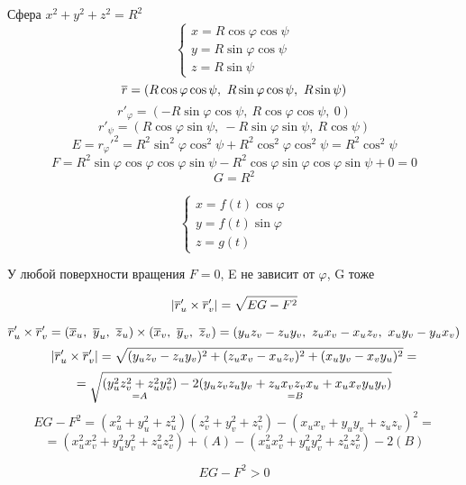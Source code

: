 \documentclass[main]{subfiles}
\begin{document}

	\begin{example}
		Сфера $x^2 + y^2 + z^2 = R^2$
		\[\begin{cases}
		  x = R \cos\varphi \cos\psi\\
		  y = R \sin\varphi \cos\psi\\
		  z = R \sin\psi
		\end{cases}\]
		\[\overline{r} = (R \cos\varphi \cos\psi,\ R\sin\varphi \cos\psi,\ R \sin\psi)\]
		\[r'_{\varphi} = (-R \sin\varphi \cos\psi,\ R\cos\varphi \cos\psi,\ 0)\]
		\[r'_{\psi} = (R \cos\varphi \sin\psi,\ -R\sin\varphi \sin\psi,\ R \cos\psi)\]
		\[E = r_{\varphi}'^2 = R^2 \sin^2 \varphi \cos^2 \psi + R^2 \cos^2 \varphi \cos^2 \psi = R^2 \cos^2 \psi\]
		\[F = R^2 \sin\varphi \cos\varphi\cos\varphi\sin\psi - R^2 \cos\varphi \sin\varphi \cos\varphi \sin\psi + 0 = 0\]
		\[G = R^2\]
	\end{example}

	\begin{Example} 
		\[\begin{cases}
		  x = f(t) \cos\varphi\\
		  y = f(t) \sin\varphi\\
		  z = g(t)
		\end{cases}\]
	\end{Example}

	\begin{upr}
		У любой поверхности вращения $F=0$, E не зависит от $\varphi$, G тоже
	\end{upr}

	\begin{Theorem}
		\[|\overline{r}'_u \times \overline{r}'_v| = \sqrt{EG-F^2}\]
	\end{Theorem}

	\begin{Proof}
		\[\ol{r}_u' \times \ol{r}_v' = (\ol{x}_u,\ \ol{y}_u,\ \ol{z}_u) \times (\ol{x}_v,\ \ol{y}_v,\ \ol{z}_v) = (y_u z_v - z_u y_v,\ z_u x_v - x_u z_v,\ x_u y_v - y_u x_v)\]
		\[|\overline{r}_u' \times \overline{r}_v'| = \sqrt{(y_u z_v - z_u y_v)^2 + (z_u x_v - x_u z_v)^2 + (x_u y_v - x_v y_u)^2} = \]
		\[= \sqrt{\underset{=A}{(y_u^2 z_v^2 + z_u^2 y_v^2)} - 2 \underset{=B}{(y_u z_v z_u y_v + z_u x_v z_v x_u + x_u x_v y_u y_v)}}\]
		\[EG-F^2 = (x_u^2 + y_u^2 + z_u^2)(z_v^2 + y_v^2 + z_v^2) - (x_u x_v + y_u y_v + z_u z_v)^2 =\]
		\[= (x_u^2 x_v^2 + y_u^2 y_v^2 + z_u^2 z_v^2) + (A)-(x_u^2 x_v^2 + y_u^2 y_v^2 + z_u^2 z_v^2) - 2(B)\]
	\end{Proof}

	\begin{Consequence}
		\[EG-F^2 > 0\]
	\end{Consequence}
\end{document}
